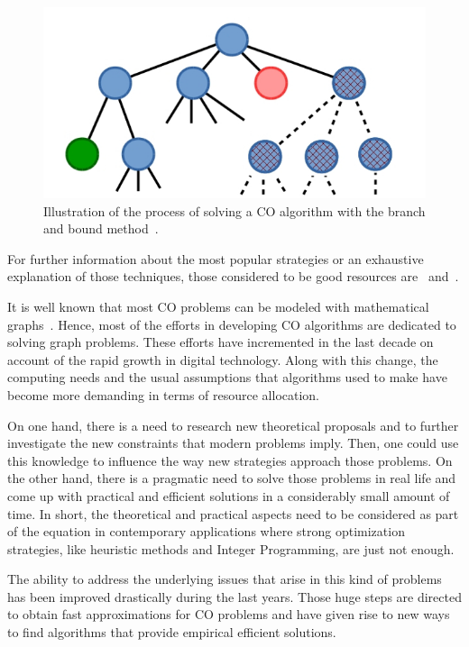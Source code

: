 \begin{figure}[h!]
    \centering
    \label{fig:branchbound}
    \includegraphics[scale=0.5]{theory_branch_and_bound.jpg}
    \caption{Illustration of the process of solving a CO algorithm with the branch and bound method~\cite{branchimage}.}
\end{figure}

For further information about the most popular strategies or an exhaustive explanation of those techniques, those considered to be good resources are~\cite{fernandes} and~\cite{integeroptimization}.

It is well known that most CO problems can be modeled with mathematical graphs~\citep{appcombinatorial}. Hence, most of the efforts in developing CO algorithms are dedicated to solving graph problems. These efforts have incremented in the last decade on account of the rapid growth in digital technology. Along with this change, the computing needs and the usual assumptions that algorithms used to make have become more demanding in terms of resource allocation.

On one hand, there is a need to research new theoretical proposals and to further investigate the new constraints that modern problems imply. Then, one could use this knowledge to influence the way new strategies approach those problems. On the other hand, there is a pragmatic need to solve those problems in real life and come up with practical and efficient solutions in a considerably small amount of time. In short, the theoretical and practical aspects need to be considered as part of the equation in contemporary applications where strong optimization strategies, like heuristic methods and Integer Programming, are just not enough.


The ability to address the underlying issues that arise in this kind of problems has been improved drastically during the last years. Those huge steps are directed to obtain fast approximations for CO problems and have given rise to new ways to find algorithms that provide empirical efficient solutions.

